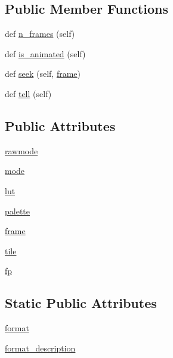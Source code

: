\subsection*{Public Member Functions}
\begin{DoxyCompactItemize}
\item 
def \hyperlink{classPIL_1_1ImImagePlugin_1_1ImImageFile_ac72aaab73de738422899e1e2bf4a74d3}{n\+\_\+frames} (self)
\item 
def \hyperlink{classPIL_1_1ImImagePlugin_1_1ImImageFile_a45360604f27f6ebd86ea73b345ca2b82}{is\+\_\+animated} (self)
\item 
def \hyperlink{classPIL_1_1ImImagePlugin_1_1ImImageFile_ae9406e6d0d20f63e726c616eb0b4bbba}{seek} (self, \hyperlink{classPIL_1_1ImImagePlugin_1_1ImImageFile_a2f8b6cccd318bb1e511eecf9aa234b61}{frame})
\item 
def \hyperlink{classPIL_1_1ImImagePlugin_1_1ImImageFile_ae6c067dd61a3cb456c4fa0208cd4e504}{tell} (self)
\end{DoxyCompactItemize}
\subsection*{Public Attributes}
\begin{DoxyCompactItemize}
\item 
\hyperlink{classPIL_1_1ImImagePlugin_1_1ImImageFile_a6937b175a1c14df033a1431a1f3f3b97}{rawmode}
\item 
\hyperlink{classPIL_1_1ImImagePlugin_1_1ImImageFile_a140f73296a809730a887b7bd4614b8b5}{mode}
\item 
\hyperlink{classPIL_1_1ImImagePlugin_1_1ImImageFile_ae7510943906c4fc2023392e573fc36db}{lut}
\item 
\hyperlink{classPIL_1_1ImImagePlugin_1_1ImImageFile_a7ad31be75a4c05f5917bb77e5aba0593}{palette}
\item 
\hyperlink{classPIL_1_1ImImagePlugin_1_1ImImageFile_a2f8b6cccd318bb1e511eecf9aa234b61}{frame}
\item 
\hyperlink{classPIL_1_1ImImagePlugin_1_1ImImageFile_a440663d16f6b522da9e3d7b7e4d5eef4}{tile}
\item 
\hyperlink{classPIL_1_1ImImagePlugin_1_1ImImageFile_a46e18222d8fdd79afd6690d435f45b68}{fp}
\end{DoxyCompactItemize}
\subsection*{Static Public Attributes}
\begin{DoxyCompactItemize}
\item 
\hyperlink{classPIL_1_1ImImagePlugin_1_1ImImageFile_ac78b8f790ef883a8ee137a639116649b}{format}
\item 
\hyperlink{classPIL_1_1ImImagePlugin_1_1ImImageFile_addb9ac4967acecb751b6e9632bbb8b86}{format\+\_\+description}
\end{DoxyCompactItemize}


